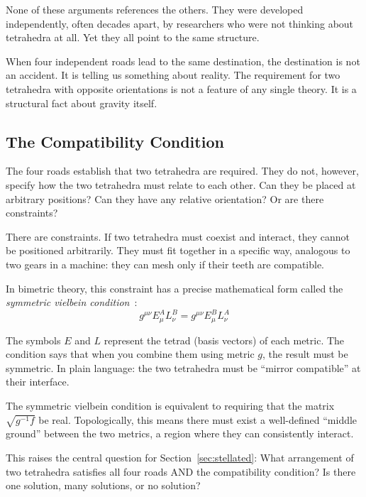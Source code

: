 \documentclass[aps,prd,preprint,superscriptaddress,showpacs,preprintnumbers,amsmath,amssymb,nofootinbib]{revtex4-2}
\begin{document}
None of these arguments references the others. They were developed independently, often decades apart, by researchers who were not thinking about tetrahedra at all. Yet they all point to the same structure.

When four independent roads lead to the same destination, the destination is not an accident. It is telling us something about reality. The requirement for two tetrahedra with opposite orientations is not a feature of any single theory. It is a structural fact about gravity itself.

\subsection{The Compatibility Condition}
\label{subsec:compatibility}

The four roads establish that two tetrahedra are required. They do not, however, specify how the two tetrahedra must relate to each other. Can they be placed at arbitrary positions? Can they have any relative orientation? Or are there constraints?

There are constraints. If two tetrahedra must coexist and interact, they cannot be positioned arbitrarily. They must fit together in a specific way, analogous to two gears in a machine: they can mesh only if their teeth are compatible.

In bimetric theory, this constraint has a precise mathematical form called the \emph{symmetric vielbein condition}~\cite{deffayet2013}:
\begin{equation}
g^{\mu\nu} E^A_\mu L^B_\nu = g^{\mu\nu} E^B_\mu L^A_\nu
\end{equation}

The symbols $E$ and $L$ represent the tetrad (basis vectors) of each metric. The condition says that when you combine them using metric $g$, the result must be symmetric. In plain language: the two tetrahedra must be ``mirror compatible'' at their interface.

The symmetric vielbein condition is equivalent to requiring that the matrix $\sqrt{g^{-1}f}$ be real. Topologically, this means there must exist a well-defined ``middle ground'' between the two metrics, a region where they can consistently interact.

This raises the central question for Section~\ref{sec:stellated}: What arrangement of two tetrahedra satisfies all four roads AND the compatibility condition? Is there one solution, many solutions, or no solution?
\end{document}
